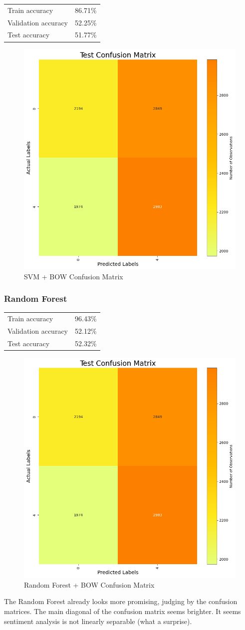 \documentclass[12pt]{article}
\begin{document}
\begin{tabular}{lr}
    Train accuracy & 86.71\%\\
    Validation accuracy & 52.25\%\\
    Test accuracy & 51.77\%\\
\end{tabular}

\begin{figure}[h!]
    \centering
    \includegraphics[width=.3\textwidth]{P2.BOW.1.png}
    \caption{SVM + BOW Confusion Matrix}
    \label{fig:2.BOW.1}
\end{figure}

\subsubsection{Random Forest}

\begin{tabular}{lr}
    Train accuracy & 96.43\%\\
    Validation accuracy & 52.12\%\\
    Test accuracy & 52.32\%\\
\end{tabular}

\begin{figure}[h!]
    \centering
    \includegraphics[width=.3\textwidth]{P2.BOW.1.png}
    \caption{Random Forest + BOW Confusion Matrix}
    \label{fig:2.BOW.2}
\end{figure}

The Random Forest already looks more promising, judging by the confusion matrices.
The main diagonal of the confusion matrix seems brighter. It seems
sentiment analysis is not linearly separable (what a surprise).
\end{document}
